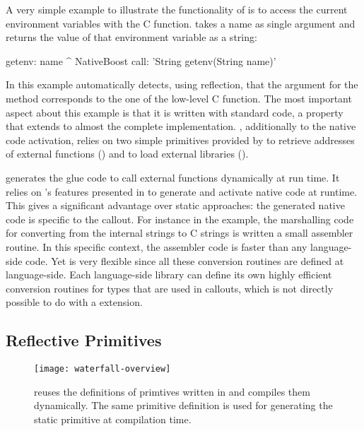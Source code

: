 A very simple example to illustrate the functionality of \NB is to access the current environment variables with the  C function.
 takes a name as single argument and returns the value of that environment variable as a string:
%
\begin{stcode}{4}
getenv: name
    ^ NativeBoost call: 'String getenv(String name)'
\end{stcode}
%
In this example \NB automatically detects, using reflection, that the argument for the \PH method corresponds to the one of the low-level C function.
The most important aspect about this example is that it is written with standard \PH code, a property that extends to almost the complete implementation.
\NB, additionally to the native code activation, relies on two simple primitives provided by \B to retrieve addresses of external functions () and to load external libraries ().

\NB generates the glue code to call external functions dynamically at run time.
It relies on \B's features presented in  to generate and activate native code at runtime.
This gives \NB a significant advantage over static approaches: the generated native code is specific to the callout.
For instance in the  example, the marshalling code for converting from the internal \PH strings to C strings is written a small assembler routine.
In this specific context, the assembler code is faster than any language-side code.
Yet \NB is very flexible since all these conversion routines are defined at language-side. 
Each language-side library can define its own highly efficient conversion routines for types that are used in \FFI callouts, which is not directly possible to do with a \VM extension.


\subsection{Reflective Primitives}

\begin{figure}[h]
	\centering
	\texttt{[image: waterfall-overview]}
	\caption[\WF Overview]{\WF reuses the definitions of \VM primtives written in \Slang and compiles them dynamically. The same primitive definition is used for generating the static primitive at \VM compilation time.}
\end{figure}

